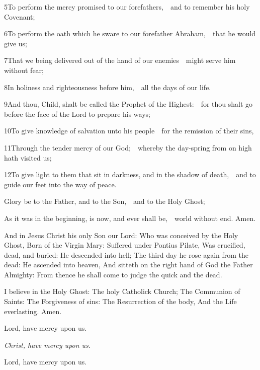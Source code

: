 5\enspace To perform the mercy promised to our forefathers,\ \star\ and to remember his holy Covenant;

6\enspace To perform the oath which he sware to our forefather Abraham,\ \star\ that he would give us;

7\enspace That we being delivered out of the hand of our enemies\ \star\ might serve him without fear;

8\enspace In holiness and righteousness before him,\ \star\ all the days of our life.

9\enspace And thou, Child, shalt be called the Prophet of the Highest:\ \star\ for thou shalt go before the face of the Lord to prepare his ways;

10\enspace To give knowledge of salvation unto his people\ \star\ for the remission of their sins,

11\enspace Through the tender mercy of our God;\ \star\ whereby the day-spring from on high hath visited us;

12\enspace To give light to them that sit in darkness, and in the shadow of death,\ \star\ and to guide our feet into the way of peace.

Glory be to the Father, and to the Son,\ \star\ and to the Holy Ghost;

As it was in the beginning, is now, and ever shall be,\ \star\ world without end. Amen.

\bigskip
{}


And in Jesus Christ his only Son our Lord: Who was conceived by the Holy Ghost, Born of the Virgin Mary: Suffered under Pontius Pilate, Was crucified, dead, and buried: He descended into hell; The third day he rose again from the dead: He ascended into heaven, And sitteth on the right hand of God the Father Almighty: From thence he shall come to judge the quick and the dead.

I believe in the Holy Ghost: The holy Catholick Church; The Communion of Saints: The Forgiveness of sins: The Resurrection of the body, And the Life everlasting. Amen.


\bigskip
{}

\centerline{Lord, have mercy upon us.}
\centerline{\emph{Christ, have mercy upon us.}}
\centerline{Lord, have mercy upon us.}

